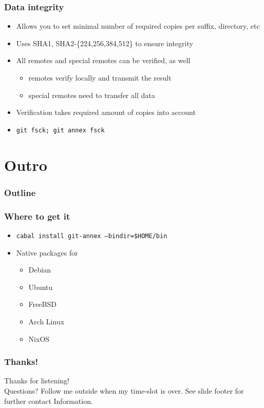 \documentclass[t]{beamer}
\begin{document}
\begin{frame}
	\frametitle{Data integrity}
	\begin{itemize}
		\item Allows you to set minimal number of required copies per suffix, directory, etc
		\item Uses SHA1, SHA2-\{224,256,384,512\} to ensure integrity
		\item All remotes and special remotes can be verified, as well
		\begin{itemize}
			\item remotes verify locally and transmit the result
			\item special remotes need to transfer all data
		\end{itemize}
		\item Verification takes required amount of copies into account
		\item \texttt{git fsck; git annex fsck}
	\end{itemize}
\end{frame}


\section{Outro}

\begin{frame}
	\frametitle{Outline}
	\tableofcontents[currentsection]
\end{frame}

\begin{frame}
	\frametitle{Where to get it}
	\begin{itemize}
		\item \texttt{cabal install git-annex --bindir=\$HOME/bin}
		\item Native packages for
		\begin{itemize}
			\item Debian
			\item Ubuntu
			\item FreeBSD
			\item Arch Linux
			\item NixOS
		\end{itemize}
	\end{itemize}
\end{frame}

\begin{frame}
	\frametitle{Thanks!}
		\begin{center}
			\vfill
			Thanks for listening!\\
			\vfill
			Questions? Follow me outside when my time-slot is over.
			\vfill
			See slide footer for further contact Information.
			\vfill
		\end{center}
\end{frame}
\end{document}
